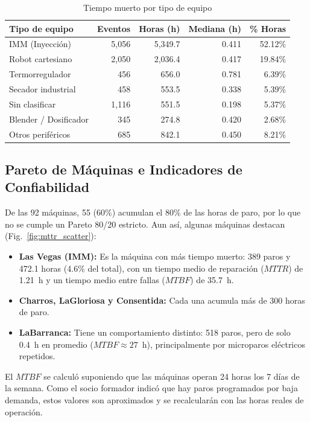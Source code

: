 \documentclass[conference]{IEEEtran}
\begin{document}
\begin{table}[htbp]
\caption{Tiempo muerto por tipo de equipo}
\label{tab:equipos}
\begin{center}
\begin{tabular}{lrrrr}
\toprule
\textbf{Tipo de equipo} & \textbf{Eventos} & \textbf{Horas (h)} & \textbf{Mediana (h)} & \textbf{\% Horas} \\
\midrule
IMM (Inyección) & 5,056 & 5,349.7 & 0.411 & 52.12\% \\
Robot cartesiano & 2,050 & 2,036.4 & 0.417 & 19.84\% \\
Termorregulador & 456 & 656.0 & 0.781 & 6.39\% \\
Secador industrial & 458 & 553.5 & 0.338 & 5.39\% \\
Sin clasificar & 1,116 & 551.5 & 0.198 & 5.37\% \\
Blender / Dosificador & 345 & 274.8 & 0.420 & 2.68\% \\
Otros periféricos & 685 & 842.1 & 0.450 & 8.21\% \\
\bottomrule
\end{tabular}
\end{center}
\end{table}

\subsection{Pareto de Máquinas e Indicadores de Confiabilidad}
De las 92 máquinas, 55 (60\%) acumulan el 80\% de las horas de paro, por lo que no se cumple un Pareto 80/20 estricto. Aun así, algunas máquinas destacan (Fig.~\ref{fig:mttr_scatter}):
\begin{itemize}
    \item \textbf{Las Vegas (IMM):} Es la máquina con más tiempo muerto: 389 paros y 472.1 horas (4.6\% del total), con un tiempo medio de reparación ($MTTR$) de 1.21~h y un tiempo medio entre fallas ($MTBF$) de 35.7~h.
    \item \textbf{Charros, LaGloriosa y Consentida:} Cada una acumula más de 300 horas de paro.
    \item \textbf{LaBarranca:} Tiene un comportamiento distinto: 518 paros, pero de solo 0.4~h en promedio ($MTBF \approx 27$~h), principalmente por microparos eléctricos repetidos.
\end{itemize}
El $MTBF$ se calculó suponiendo que las máquinas operan 24 horas los 7 días de la semana. Como el socio formador indicó que hay paros programados por baja demanda, estos valores son aproximados y se recalcularán con las horas reales de operación.
\end{document}

